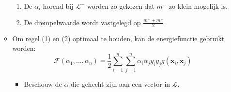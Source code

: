 \begin{itemize}
\begin{itemize}
\begin{enumerate}
            \item De $\alpha_i$ horend bij $\mathcal{L}^-$ worden zo gekozen dat $m^-$ zo klein mogelijk is.
            \item De drempelwaarde wordt vastgelegd op $\frac{m^+ + m^-}{2}$
        \end{enumerate}
        \item Om regel (1) en (2) optimaal te houden, kan de energiefunctie gebruikt worden:
        $$\mathcal{F}(\alpha_1, ..., \alpha_n) = \frac{1}{2}\sum_{i = 1}^{n}\sum_{j = 1}^{n} \alpha_i\alpha_jy_iy_jg(\textbf{x}_i, \textbf{x}_j)$$
        \begin{itemize}
            \item Beschouw de $\alpha$ die gehecht zijn aan een vector in $\mathcal{L}$.
        \end{itemize}
    \end{itemize}
\end{itemize}
